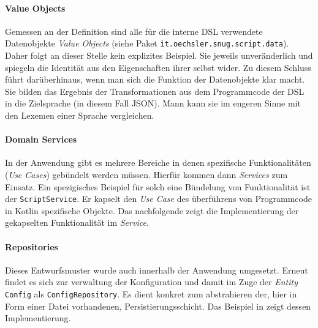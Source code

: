 \bgroup

    \label{lst:config}
\egroup

\paragraph{Value Objects} 

Gemessen an der Definition sind alle für die interne DSL verwendete Datenobjekte \emph{Value Objects} (siehe Paket \texttt{it.oechsler.snug.script.data}).
Daher folgt an dieser Stelle kein explizites Beispiel.
Sie jeweils unveränderlich und spiegeln die Identität aus den Eigenschaften ihrer selbst wider.
Zu diesem Schluss führt darüberhinaus, wenn man sich die Funktion der Datenobjekte klar macht.
Sie bilden das Ergebnis der Transformationen aus dem Programmcode der DSL in die Zielsprache (in diesem Fall JSON).
Mann kann sie im engeren Sinne mit den Lexemen einer Sprache vergleichen.

\paragraph{Domain Services}

In der Anwendung gibt es mehrere Bereiche in denen spezifische Funktionalitäten (\emph{Use Cases}) gebündelt werden müssen.
Hierfür kommen dann \emph{Services} zum Einsatz.
Ein spezigisches Beispiel für solch eine Bündelung von Funktionalität ist der \texttt{ScriptService}.
Er kapselt den \emph{Use Case} des überführens von Programmcode in Kotlin spezifische Objekte. Das nachfolgende  zeigt die Implementierung der gekapselten Funktionalität im \emph{Service}.

\bgroup

    \label{lst:script_service}
\egroup

\paragraph{Repositories}

Dieses Entwurfsmuster wurde auch innerhalb der Anwendung umgesetzt.
Erneut findet es sich zur verwaltung der Konfiguration und damit im Zuge der \emph{Entity} \texttt{Config} als \texttt{ConfigRepository}.
Es dient konkret zum abstrahieren der, hier in Form einer Datei vorhandenen, Persistierungsschicht.
Das Beispiel in  zeigt dessen Implementierung.

\bgroup

    \label{lst:config_repository}
\egroup